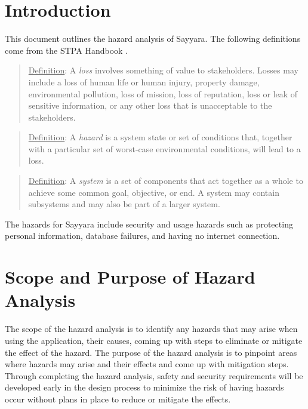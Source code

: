 \documentclass{article}
\begin{document}
\tableofcontents

\newpage

\listoftables

\listoffigures

\newpage


\section{Introduction}
This document outlines the hazard analysis of Sayyara. The following definitions come from the STPA
Handbook \citep{Nancy2018}.

\blockquote[\cite{Nancy2018}]{\underline{Definition}: A \textit{loss} involves something of value to
	stakeholders. Losses may include a loss of human life or human injury, property damage, environmental
	pollution, loss of mission, loss of reputation, loss or leak of sensitive information, or any other
	loss that is unacceptable to the stakeholders.}

\blockquote[\cite{Nancy2018}]{\underline{Definition}: A \textit{hazard} is a system state or set of
	conditions that, together with a particular set of worst-case environmental conditions, will lead to
	a loss.}

\blockquote[\cite{Nancy2018}]{\underline{Definition}: A \textit{system} is a set of components that
	act together as a whole to achieve some common goal, objective, or end. A system may contain
	subsystems and may also be part of a larger system.}

The hazards for Sayyara include security and usage hazards such as protecting personal information,
database failures, and having no internet connection.

\section{Scope and Purpose of Hazard Analysis}
The scope of the hazard analysis is to identify any hazards that may arise when using the
application, their causes, coming up with steps to eliminate or mitigate the effect of the hazard.
The purpose of the hazard analysis is to pinpoint areas where hazards may arise and their effects
and come up with mitigation steps. Through completing the hazard analysis, safety and security
requirements will be developed early in the design process to minimize the risk of having hazards
occur without plans in place to reduce or mitigate the effects.
\end{document}
